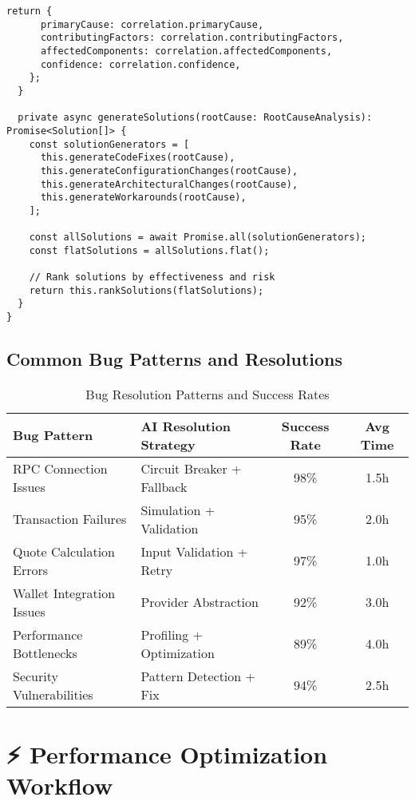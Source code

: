 \documentclass[11pt,a4paper]{article}
\begin{document}
\begin{lstlisting}[style=typescript, caption=AI-Powered Bug Detection System]
    return {
      primaryCause: correlation.primaryCause,
      contributingFactors: correlation.contributingFactors,
      affectedComponents: correlation.affectedComponents,
      confidence: correlation.confidence,
    };
  }

  private async generateSolutions(rootCause: RootCauseAnalysis): Promise<Solution[]> {
    const solutionGenerators = [
      this.generateCodeFixes(rootCause),
      this.generateConfigurationChanges(rootCause),
      this.generateArchitecturalChanges(rootCause),
      this.generateWorkarounds(rootCause),
    ];

    const allSolutions = await Promise.all(solutionGenerators);
    const flatSolutions = allSolutions.flat();

    // Rank solutions by effectiveness and risk
    return this.rankSolutions(flatSolutions);
  }
}
\end{lstlisting}

\subsection{Common Bug Patterns and Resolutions}

\begin{table}[h]
\centering
\begin{tabular}{|l|l|c|c|}
\hline
\textbf{Bug Pattern} & \textbf{AI Resolution Strategy} & \textbf{Success Rate} & \textbf{Avg Time} \\
\hline
RPC Connection Issues & Circuit Breaker + Fallback & 98\% & 1.5h \\
Transaction Failures & Simulation + Validation & 95\% & 2.0h \\
Quote Calculation Errors & Input Validation + Retry & 97\% & 1.0h \\
Wallet Integration Issues & Provider Abstraction & 92\% & 3.0h \\
Performance Bottlenecks & Profiling + Optimization & 89\% & 4.0h \\
Security Vulnerabilities & Pattern Detection + Fix & 94\% & 2.5h \\
\hline
\end{tabular}
\caption{Bug Resolution Patterns and Success Rates}
\end{table}

\section{⚡ Performance Optimization Workflow}
\end{document}
